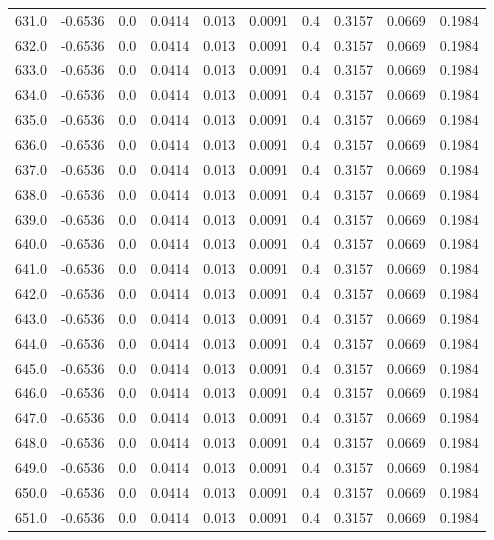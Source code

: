 \begin{longtable}{lrrrrrrrrr}
631.0 & -0.6536 & 0.0 & 0.0414 & 0.013 & 0.0091 & 0.4 & 0.3157 & 0.0669 & 0.1984 \\
632.0 & -0.6536 & 0.0 & 0.0414 & 0.013 & 0.0091 & 0.4 & 0.3157 & 0.0669 & 0.1984 \\
633.0 & -0.6536 & 0.0 & 0.0414 & 0.013 & 0.0091 & 0.4 & 0.3157 & 0.0669 & 0.1984 \\
634.0 & -0.6536 & 0.0 & 0.0414 & 0.013 & 0.0091 & 0.4 & 0.3157 & 0.0669 & 0.1984 \\
635.0 & -0.6536 & 0.0 & 0.0414 & 0.013 & 0.0091 & 0.4 & 0.3157 & 0.0669 & 0.1984 \\
636.0 & -0.6536 & 0.0 & 0.0414 & 0.013 & 0.0091 & 0.4 & 0.3157 & 0.0669 & 0.1984 \\
637.0 & -0.6536 & 0.0 & 0.0414 & 0.013 & 0.0091 & 0.4 & 0.3157 & 0.0669 & 0.1984 \\
638.0 & -0.6536 & 0.0 & 0.0414 & 0.013 & 0.0091 & 0.4 & 0.3157 & 0.0669 & 0.1984 \\
639.0 & -0.6536 & 0.0 & 0.0414 & 0.013 & 0.0091 & 0.4 & 0.3157 & 0.0669 & 0.1984 \\
640.0 & -0.6536 & 0.0 & 0.0414 & 0.013 & 0.0091 & 0.4 & 0.3157 & 0.0669 & 0.1984 \\
641.0 & -0.6536 & 0.0 & 0.0414 & 0.013 & 0.0091 & 0.4 & 0.3157 & 0.0669 & 0.1984 \\
642.0 & -0.6536 & 0.0 & 0.0414 & 0.013 & 0.0091 & 0.4 & 0.3157 & 0.0669 & 0.1984 \\
643.0 & -0.6536 & 0.0 & 0.0414 & 0.013 & 0.0091 & 0.4 & 0.3157 & 0.0669 & 0.1984 \\
644.0 & -0.6536 & 0.0 & 0.0414 & 0.013 & 0.0091 & 0.4 & 0.3157 & 0.0669 & 0.1984 \\
645.0 & -0.6536 & 0.0 & 0.0414 & 0.013 & 0.0091 & 0.4 & 0.3157 & 0.0669 & 0.1984 \\
646.0 & -0.6536 & 0.0 & 0.0414 & 0.013 & 0.0091 & 0.4 & 0.3157 & 0.0669 & 0.1984 \\
647.0 & -0.6536 & 0.0 & 0.0414 & 0.013 & 0.0091 & 0.4 & 0.3157 & 0.0669 & 0.1984 \\
648.0 & -0.6536 & 0.0 & 0.0414 & 0.013 & 0.0091 & 0.4 & 0.3157 & 0.0669 & 0.1984 \\
649.0 & -0.6536 & 0.0 & 0.0414 & 0.013 & 0.0091 & 0.4 & 0.3157 & 0.0669 & 0.1984 \\
650.0 & -0.6536 & 0.0 & 0.0414 & 0.013 & 0.0091 & 0.4 & 0.3157 & 0.0669 & 0.1984 \\
651.0 & -0.6536 & 0.0 & 0.0414 & 0.013 & 0.0091 & 0.4 & 0.3157 & 0.0669 & 0.1984 \\

\end{longtable}
